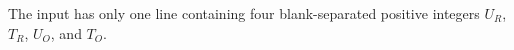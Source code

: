 The input has only one line containing
four blank-separated positive integers $U_R$, $T_R$, $U_O$, and $T_O$.
